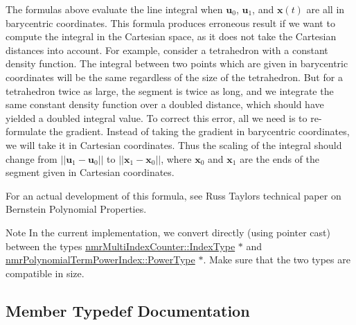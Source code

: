 The formulas above evaluate the line integral when $\mathbf{u}_0$, $\mathbf{u}_1$, and $\mathbf{x}(t)$ are all in barycentric coordinates. This formula produces erroneous result if we want to compute the integral in the Cartesian space, as it does not take the Cartesian distances into account. For example, consider a tetrahedron with a constant density function. The integral between two points which are given in barycentric coordinates will be the same regardless of the size of the tetrahedron. But for a tetrahedron twice as large, the segment is twice as long, and we integrate the same constant density function over a doubled distance, which should have yielded a doubled integral value. To correct this error, all we need is to re-\/formulate the gradient. Instead of taking the gradient in barycentric coordinates, we will take it in Cartesian coordinates. Thus the scaling of the integral should change from $||\mathbf{u}_1 - \mathbf{u}_0 ||$ to $||\mathbf{x}_1 - \mathbf{x}_0 ||$, where $\mathbf{x}_0$ and $\mathbf{x}_1$ are the ends of the segment given in Cartesian coordinates.

For an actual development of this formula, see Russ Taylor\textquotesingle{}s technical paper on Bernstein Polynomial Properties.

\begin{DoxyNote}{Note}
In the current implementation, we convert directly (using pointer cast) between the types \textquotesingle{}\hyperlink{classnmr_multi_index_counter_a0632b941a7d18df347174b4345d73d01}{nmr\+Multi\+Index\+Counter\+::\+Index\+Type} $\ast$\textquotesingle{} and \textquotesingle{}\hyperlink{classnmr_polynomial_term_power_index_a2eec01c3a2c3f56f47982ceffd8e36ed}{nmr\+Polynomial\+Term\+Power\+Index\+::\+Power\+Type} $\ast$\textquotesingle{}. Make sure that the two types are compatible in size. 
\end{DoxyNote}


\subsection{Member Typedef Documentation}
\hypertarget{classnmr_bernstein_polynomial_line_integral_a0dc7480d6f60af6d3d8da6e32444edf7}{}
